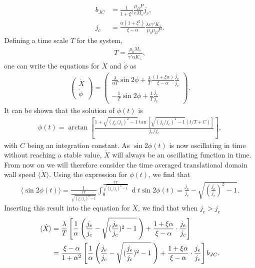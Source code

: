 \documentclass[12pt, a4paper, twoside, openright]{article}		%
\renewcommand{\d}[1]{\ensuremath{\operatorname{d}\!{#1}}}
\numberwithin{equation}{section}
\begin{document}
\begin{align}
b_{JC} &= \frac{1}{1+\xi^2}\frac{\mu_B P}{e M_s} j_c, \\
j_c &= \frac{\alpha(1+\xi^2)}{\xi-\alpha}\frac{\lambda e \gamma ' K_{\perp}}{\mu_0\mu_B P}. \label{eq:critical_current}
\end{align}
Defining a time scale $T$ for the system,
\begin{align}
T = \frac{\mu_0 M_s}{\tilde{\gamma}' \alpha K_{\perp}},
\end{align}
one can write the equations for $\dot{X}$ and $\dot{\phi}$ as
\begin{align}
\label{eq:xdot_phidot_v2}
\begin{pmatrix}
\dot{X} \\ \dot{\phi}
\end{pmatrix}
=
\begin{pmatrix}
\frac{\lambda}{\alpha T} \sin2\phi + \frac{\lambda}{T}\frac{(1+\xi\alpha)}{\xi - \alpha} \frac{j_e}{j_c} \\
-\frac{1}{T}  \sin2\phi + \frac{1}{T}\frac{j_e}{j_c}
\end{pmatrix}.
\end{align}
It can be shown that the solution of $\phi(t)$ is
\begin{align}
\phi(t) = \arctan\left[\frac{1+\sqrt{(j_e/j_c)^2-1}\tan\left[\sqrt{(j_e/j_c)^2-1}(t/T+C)\right]}{j_e/j_c}\right],
\end{align}
with $C$ being an integration constant. As $\sin2\phi(t)$ is now oscillating in time without reaching a stable value, $\dot{X}$ will always be an oscillating function in time. From now on we will therefore consider the time averaged translational domain wall speed $\langle \dot{X} \rangle$. Using the expression for $\phi(t)$, we find that
\begin{align}
\langle\sin2\phi(t)\rangle = \frac{1}{\frac{\pi T}{\sqrt{(j_e/j_c)^2-1}}} \int_0^{\frac{\pi T}{\sqrt{(j_e/j_c)^2-1}}} \d t \sin2\phi(t) = \frac{j_e}{j_c}-\sqrt{\left(\frac{j_e}{j_c}\right)^2-1}.
\end{align}
Inserting this result into the equation for $\dot{X}$, we find that when $j_e > j_c$
\begin{align}
\label{eq:xdot_av_abovecrit}
\nonumber \langle\dot{X}\rangle &= \frac{\lambda}{T}\left[\frac{1}{\alpha}\left(\frac{j_e}{j_c}-\sqrt{(\frac{j_e}{j_c})^2-1}\hspace{1mm}\right) + \frac{1+\xi\alpha}{\xi-\alpha}\cdot\frac{j_e}{j_c}\right] \\
&= \frac{\xi-\alpha}{1+\alpha^2} \left[\frac{1}{\alpha}\left(\frac{j_e}{j_c}-\sqrt{(\frac{j_e}{j_c})^2-1}\hspace{1mm}\right) + \frac{1+\xi\alpha}{\xi-\alpha}\cdot\frac{j_e}{j_c}\right] b_{JC}.
\end{align}
\end{document}
